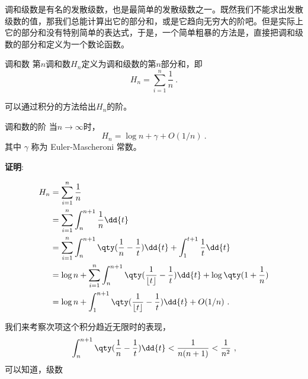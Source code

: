 

调和级数是有名的发散级数，也是最简单的发散级数之一。既然我们不能求出发散级数的值，那我们总能计算出它的部分和，或是它趋向无穷大的阶吧。但是实际上它的部分和没有特别简单的表达式，于是，一个简单粗暴的方法是，直接把调和级数的部分和定义为一个数论函数。

\begin{definition}{调和数}
第$n$调和数$H_n$定义为调和级数的第$n$部分和，即
\begin{equation}
H_n = \sum_{i=1}^n\frac{1}{n}~.
\end{equation}
\end{definition}

可以通过积分的方法给出$H_n$的阶。

\begin{theorem}{调和数的阶}
当$n\to\infty$时，
\begin{equation}
H_n = \log n + \gamma + O(1/n) ~.
\end{equation}
其中 $\gamma$ 称为 Euler-Mascheroni 常数。
\end{theorem}

\textbf{证明}:

\begin{equation}
\begin{aligned}
H_n & = \sum_{i=1}^n\frac{1}{n}\\
& = \sum_{i=1}^n\int_n^{n+1}\frac{1}{n}\dd{t}\\
& = \sum_{i=1}^n\int_n^{n+1}\qty(\frac{1}{n}-\frac{1}{t})\dd{t}+\int_1^{t+1}\frac{1}{t}\dd{t}\\
& = \log n+\sum_{i=1}^n\int_n^{n+1}\qty(\frac{1}{\lfloor t\rfloor}-\frac{1}{t})\dd{t}+\log\qty(1+\frac{1}{n})\\
& = \log n+\int_1^{n+1}\qty(\frac{1}{\lfloor t\rfloor}-\frac{1}{t})\dd{t}+O(1/n)~.
\end{aligned}
\end{equation}

我们来考察次项这个积分趋近无限时的表现，
\begin{equation}
\int_n^{n+1}\qty(\frac{1}{n}-\frac{1}{t})\dd{t}<\frac{1}{n(n+1)}<\frac{1}{n^2}~,
\end{equation}
可以知道，级数
